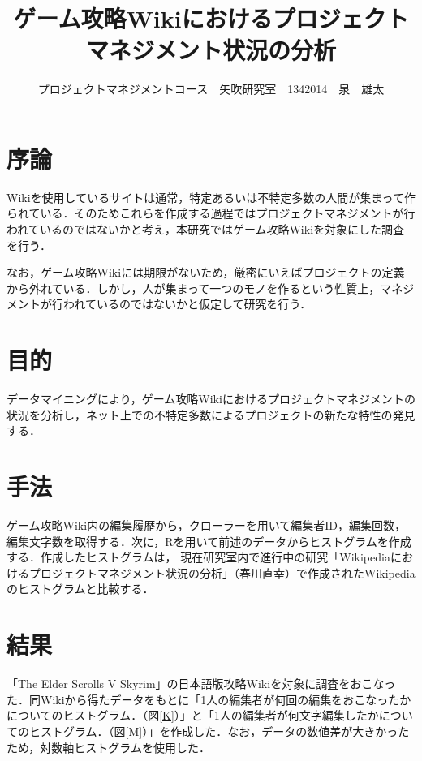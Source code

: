 \documentclass[uplatex,twocolumn,dvipdfmx]{jsarticle}
\title{\vspace{-5mm}\fontsize{14pt}{0pt}\selectfont  ゲーム攻略Wikiにおけるプロジェクトマネジメント状況の分析}
\author{\normalsize プロジェクトマネジメントコース　矢吹研究室　1342014　泉　雄太}
\date{}
\begin{document}
\fontsize{10.5pt}{\baselineskip}\selectfont
\maketitle





\section{序論}

Wikiを使用しているサイトは通常，特定あるいは不特定多数の人間が集まって作られている．そのためこれらを作成する過程ではプロジェクトマネジメントが行われているのではないかと考え，本研究ではゲーム攻略Wikiを対象にした調査を行う．

なお，ゲーム攻略Wikiには期限がないため，厳密にいえばプロジェクトの定義から外れている．しかし，人が集まって一つのモノを作るという性質上，マネジメントが行われているのではないかと仮定して研究を行う．


\section{目的}

データマイニングにより，ゲーム攻略Wikiにおけるプロジェクトマネジメントの状況を分析し，ネット上での不特定多数によるプロジェクトの新たな特性の発見する．

\section{手法}

ゲーム攻略Wiki内の編集履歴から，クローラーを用いて編集者ID，編集回数，編集文字数を取得する．次に，Rを用いて前述のデータからヒストグラムを作成する．作成したヒストグラムは，  現在研究室内で進行中の研究「Wikipediaにおけるプロジェクトマネジメント状況の分析」（春川直幸）で作成されたWikipediaのヒストグラムと比較する．

\section{結果}


「The Elder Scrolls V Skyrim」の日本語版攻略Wiki\cite{wiki}を対象に調査をおこなった．同Wikiから得たデータをもとに「1人の編集者が何回の編集をおこなったかについてのヒストグラム．（図\ref{K}）」と「1人の編集者が何文字編集したかについてのヒストグラム．（図\ref{M}）」を作成した．なお，データの数値差が大きかったため，対数軸ヒストグラムを使用した．
\end{document}

